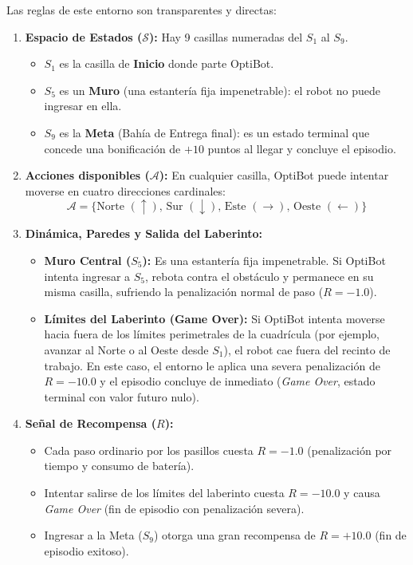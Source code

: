 Las reglas de este entorno son transparentes y directas:
\begin{enumerate}
  \item \textbf{Espacio de Estados ($\mathcal{S}$):} Hay 9 casillas numeradas del $S_1$ al $S_9$.
  \begin{itemize}
    \item $S_1$ es la casilla de \textbf{Inicio} donde parte OptiBot.
    \item $S_5$ es un \textbf{Muro} (una estantería fija impenetrable): el robot no puede ingresar en ella.
    \item $S_9$ es la \textbf{Meta} (Bahía de Entrega final): es un estado terminal que concede una bonificación de $+10$ puntos al llegar y concluye el episodio.
  \end{itemize}
  \item \textbf{Acciones disponibles ($\mathcal{A}$):} En cualquier casilla, OptiBot puede intentar moverse en cuatro direcciones cardinales:
  \[
    \mathcal{A} = \{\text{Norte } (\uparrow), \, \text{Sur } (\downarrow), \, \text{Este } (\rightarrow), \, \text{Oeste } (\leftarrow)\}
  \]
  \item \textbf{Dinámica, Paredes y Salida del Laberinto:}
  \begin{itemize}
    \item \textbf{Muro Central ($S_5$):} Es una estantería fija impenetrable. Si OptiBot intenta ingresar a $S_5$, rebota contra el obstáculo y permanece en su misma casilla, sufriendo la penalización normal de paso ($R = -1.0$).
    \item \textbf{Límites del Laberinto (Game Over):} Si OptiBot intenta moverse hacia fuera de los límites perimetrales de la cuadrícula (por ejemplo, avanzar al Norte o al Oeste desde $S_1$), el robot cae fuera del recinto de trabajo. En este caso, el entorno le aplica una severa penalización de $R = -10.0$ y el episodio concluye de inmediato (\textit{Game Over}, estado terminal con valor futuro nulo).
  \end{itemize}
  \item \textbf{Señal de Recompensa ($R$):}
  \begin{itemize}
    \item Cada paso ordinario por los pasillos cuesta $R = -1.0$ (penalización por tiempo y consumo de batería).
    \item Intentar salirse de los límites del laberinto cuesta $R = -10.0$ y causa \textit{Game Over} (fin de episodio con penalización severa).
    \item Ingresar a la Meta ($S_9$) otorga una gran recompensa de $R = +10.0$ (fin de episodio exitoso).
  \end{itemize}
\end{enumerate}

